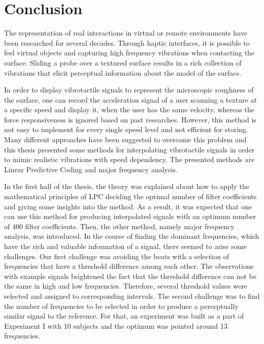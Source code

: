 \chapter{Conclusion}
\thispagestyle{empty}%
The representation of real interactions in virtual or remote environments have been researched for several decades. Through haptic interfaces, it is possible to feel virtual objects and capturing high frequency vibrations when contacting the surface. Sliding a probe over a textured surface results in a rich collection of vibrations that elicit perceptual information about the model of the surface.

In order to display vibrotactile signals to represent the microscopic roughness of the surface, one can record the acceleration signal of a user scanning a texture at a specific speed and display it, when the user has the same velocity, whereas the force responsiveness is ignored based on past researches. However, this method is not easy to implement for every single speed level and not efficient for storing. Many different approaches have been suggested to overcome this problem and this thesis presented some methods for interpolating vibrotactile signals in order to mimic realistic vibrations with speed dependency. The presented methods are Linear Predictive Coding and major frequency analysis.

In the first half of the thesis, the theory was explained about how to apply the mathematical principles of LPC deciding the optimal number of filter coefficients and giving some insights into the method. As a result, it was expected that one can use this method for producing interpolated signals with an optimum number of 400 filter coefficients. Then, the other method, namely major frequency analysis, was introduced. In the course of finding the dominant frequencies, which have the rich and valuable information of a signal, there seemed to arise some challenges. Our first challenge was avoiding the beats with a selection of frequencies that have a threshold difference among each other. The observations with example signals brightened the fact that the threshold difference can not be the same in high and low frequencies. Therefore, several threshold values were selected and assigned to corresponding intervals. The second challenge was to find the number of frequencies to be selected in order to produce a perceptually similar signal to the reference. For that, an experiment was built as a part of Experiment I with 10 subjects and the optimum was pointed around 13 frequencies.

